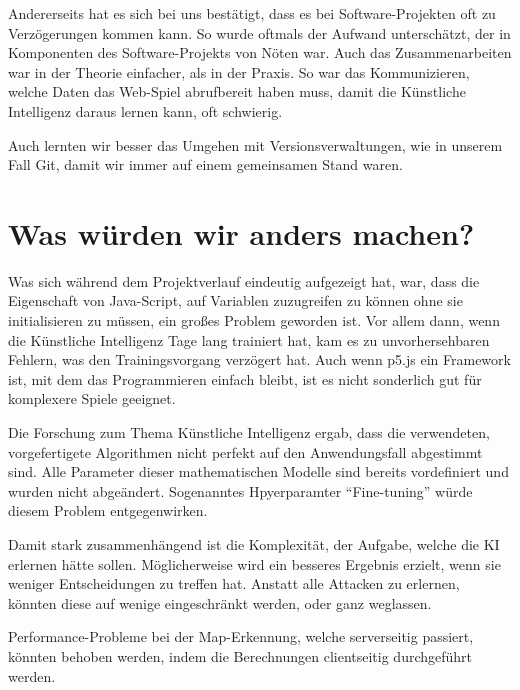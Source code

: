 Andererseits hat es sich bei uns bestätigt, dass es bei Software-Projekten oft zu Verzögerungen kommen kann.
So wurde oftmals der Aufwand unterschätzt, der in Komponenten des Software-Projekts von Nöten war.
Auch das Zusammenarbeiten war in der Theorie einfacher, als in der Praxis. So war das Kommunizieren, welche Daten das Web-Spiel abrufbereit haben muss, damit die Künstliche Intelligenz daraus lernen kann, oft schwierig.

Auch lernten wir besser das Umgehen mit Versionsverwaltungen, wie in unserem Fall Git, damit wir immer auf einem gemeinsamen Stand waren.

\section{Was würden wir anders machen?}
Was sich während dem Projektverlauf eindeutig aufgezeigt hat, war, dass die Eigenschaft von Java-Script, auf Variablen zuzugreifen zu können ohne sie initialisieren zu müssen, ein großes Problem geworden ist.
Vor allem dann, wenn die Künstliche Intelligenz Tage lang trainiert hat, kam es zu unvorhersehbaren Fehlern, was den Trainingsvorgang verzögert hat.
Auch wenn p5.js ein Framework ist, mit dem das Programmieren einfach bleibt, ist es nicht sonderlich gut für komplexere Spiele geeignet.

Die Forschung zum Thema Künstliche Intelligenz ergab, dass die verwendeten, vorgefertigete Algorithmen nicht perfekt auf den Anwendungsfall abgestimmt sind.
Alle Parameter dieser mathematischen Modelle sind bereits vordefiniert und wurden nicht abgeändert.
Sogenanntes Hpyerparamter ``Fine-tuning'' würde diesem Problem entgegenwirken.

Damit stark zusammenhängend ist die Komplexität, der Aufgabe, welche die KI erlernen hätte sollen.
Möglicherweise wird ein besseres Ergebnis erzielt, wenn sie weniger Entscheidungen zu treffen hat.
Anstatt alle Attacken zu erlernen, könnten diese auf wenige eingeschränkt werden, oder ganz weglassen.

Performance-Probleme bei der Map-Erkennung, welche serverseitig passiert, könnten behoben werden, indem
die Berechnungen clientseitig durchgeführt werden.